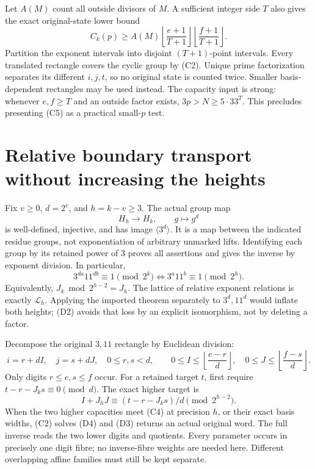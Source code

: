 Let $A(M)$ count all outside divisors of $M$. A sufficient integer side $T$
also gives the exact original-state lower bound
\[
 C_k(p)\ge A(M)
 \left\lfloor\frac{e+1}{T+1}\right\rfloor
 \left\lfloor\frac{f+1}{T+1}\right\rfloor.                 \tag{C7}
\]
Partition the exponent intervals into disjoint $(T+1)$-point intervals.
Every translated rectangle covers the cyclic group by (C2). Unique prime
factorization separates its different $i,j,t$, so no original state is counted
twice. Smaller basis-dependent rectangles may be used instead.
The capacity input is strong: whenever $e,f\ge T$ and an outside factor exists,
$3p>N\ge5\cdot33^T$. This precludes presenting (C5) as a practical small-$p$ test.

\section{Relative boundary transport without increasing the heights}
Fix $v\ge0$, $d=2^v$, and $h=k-v\ge3$. The actual group map
\[
 H_h\longrightarrow H_k,\qquad g\longmapsto g^d             \tag{D1}
\]
is well-defined, injective, and has image $\langle3^d\rangle$. It is a
map between the indicated residue groups, not exponentiation of arbitrary
unmarked lifts. Identifying each group by its retained power of $3$ proves
all assertions and gives the inverse by exponent division. In particular,
\[
 \boxed{3^{da}11^{db}\equiv1\pmod{2^k}
 \iff 3^a11^b\equiv1\pmod{2^h}.}                          \tag{D2}
\]
Equivalently, $J_k\bmod2^{h-2}=J_h$. The lattice of relative exponent relations
is exactly $\mathcal L_h$. Applying the imported theorem separately to
$3^d,11^d$ would inflate both heights; (D2) avoids that loss by an explicit
isomorphism, not by deleting a factor.

Decompose the original $3,11$ rectangle by Euclidean division:
\[
 i=r+dI,\quad j=s+dJ,\quad0\le r,s<d,\qquad
 0\le I\le\left\lfloor\frac{e-r}{d}\right\rfloor,
 \quad0\le J\le\left\lfloor\frac{f-s}{d}\right\rfloor.    \tag{D3}
\]
Only digits $r\le e,s\le f$ occur. For a retained target $t$, first require
$t-r-J_ks\equiv0\pmod d$. The exact higher target is
\[
 I+J_hJ\equiv(t-r-J_ks)/d\pmod{2^{h-2}}.                  \tag{D4}
\]
When the two higher capacities meet (C4) at precision $h$, or their exact
basis widths, (C2) solves (D4) and (D3) returns an actual original word.
The full inverse reads the two lower digits and quotients. Every parameter
occurs in precisely one digit fibre; no inverse-fibre weights are needed here.
Different overlapping affine families must still be kept separate.

